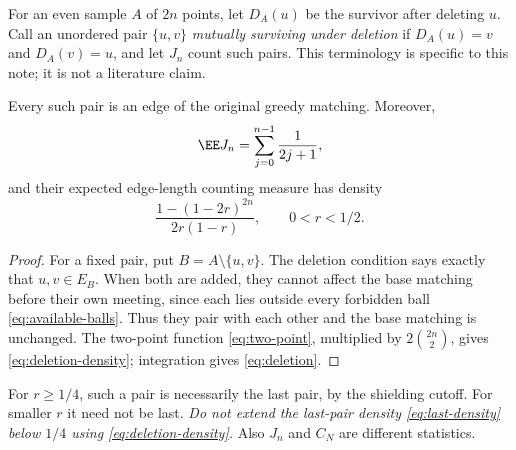 \documentclass[11pt,letterpaper]{article}
\begin{document}
For an even sample $A$ of $2n$ points, let $D_A(u)$ be the survivor after
deleting $u$. Call an unordered pair $\{u,v\}$ \emph{mutually surviving
under deletion} if $D_A(u)=v$ and $D_A(v)=u$, and let $J_n$ count such pairs.
This terminology is specific to this note; it is not a literature claim.

\begin{proposition}\label{prop:deletion}
Every such pair is an edge of the original greedy matching. Moreover,
\begin{equation}\label{eq:deletion}
 \EE J_n=\sum_{j=0}^{n-1}\frac1{2j+1},
\end{equation}
and their expected edge-length counting measure has density
\begin{equation}\label{eq:deletion-density}
 \frac{1-(1-2r)^{2n}}{2r(1-r)},\qquad 0<r<1/2.
\end{equation}
\end{proposition}
\begin{proof}
For a fixed pair, put $B=A\setminus\{u,v\}$. The deletion condition says
exactly that $u,v\in E_B$. When both are added, they cannot affect the base
matching before their own meeting, since each lies outside every forbidden
ball \eqref{eq:available-balls}. Thus they pair with each other and the
base matching is unchanged. The two-point function \eqref{eq:two-point},
multiplied by $2\binom{2n}{2}$, gives \eqref{eq:deletion-density}; integration
gives \eqref{eq:deletion}.
\end{proof}

For $r\ge1/4$, such a pair is necessarily the last pair, by the shielding
cutoff. For smaller $r$ it need not be last. \emph{Do not extend the
last-pair density \eqref{eq:last-density} below $1/4$ using
\eqref{eq:deletion-density}.} Also $J_n$ and $C_N$ are different statistics.
\end{document}
